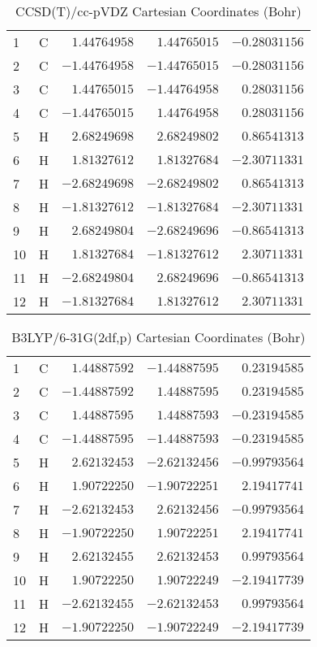 \documentclass[10pt,oneside]{article}
\begin{document}
\begin{table}[h!]
\centering
\caption{CCSD(T)/cc-pVDZ Cartesian Coordinates (Bohr)}
\begin{tabular}{llrrr}
1  & C  & $ 1.44764958$ & $ 1.44765015$ & $-0.28031156$ \\
2  & C  & $-1.44764958$ & $-1.44765015$ & $-0.28031156$ \\
3  & C  & $ 1.44765015$ & $-1.44764958$ & $ 0.28031156$ \\
4  & C  & $-1.44765015$ & $ 1.44764958$ & $ 0.28031156$ \\
5  & H  & $ 2.68249698$ & $ 2.68249802$ & $ 0.86541313$ \\
6  & H  & $ 1.81327612$ & $ 1.81327684$ & $-2.30711331$ \\
7  & H  & $-2.68249698$ & $-2.68249802$ & $ 0.86541313$ \\
8  & H  & $-1.81327612$ & $-1.81327684$ & $-2.30711331$ \\
9  & H  & $ 2.68249804$ & $-2.68249696$ & $-0.86541313$ \\
10 & H  & $ 1.81327684$ & $-1.81327612$ & $ 2.30711331$ \\
11 & H  & $-2.68249804$ & $ 2.68249696$ & $-0.86541313$ \\
12 & H  & $-1.81327684$ & $ 1.81327612$ & $ 2.30711331$ \\
\end{tabular}
\end{table}

\begin{table}[h!]
\centering
\caption{B3LYP/6-31G(2df,p) Cartesian Coordinates (Bohr)}
\begin{tabular}{llrrr}
1  & C  & $ 1.44887592$ & $-1.44887595$ & $ 0.23194585$ \\
2  & C  & $-1.44887592$ & $ 1.44887595$ & $ 0.23194585$ \\
3  & C  & $ 1.44887595$ & $ 1.44887593$ & $-0.23194585$ \\
4  & C  & $-1.44887595$ & $-1.44887593$ & $-0.23194585$ \\
5  & H  & $ 2.62132453$ & $-2.62132456$ & $-0.99793564$ \\
6  & H  & $ 1.90722250$ & $-1.90722251$ & $ 2.19417741$ \\
7  & H  & $-2.62132453$ & $ 2.62132456$ & $-0.99793564$ \\
8  & H  & $-1.90722250$ & $ 1.90722251$ & $ 2.19417741$ \\
9  & H  & $ 2.62132455$ & $ 2.62132453$ & $ 0.99793564$ \\
10 & H  & $ 1.90722250$ & $ 1.90722249$ & $-2.19417739$ \\
11 & H  & $-2.62132455$ & $-2.62132453$ & $ 0.99793564$ \\
12 & H  & $-1.90722250$ & $-1.90722249$ & $-2.19417739$ \\
\end{tabular}
\end{table}
\end{document}
